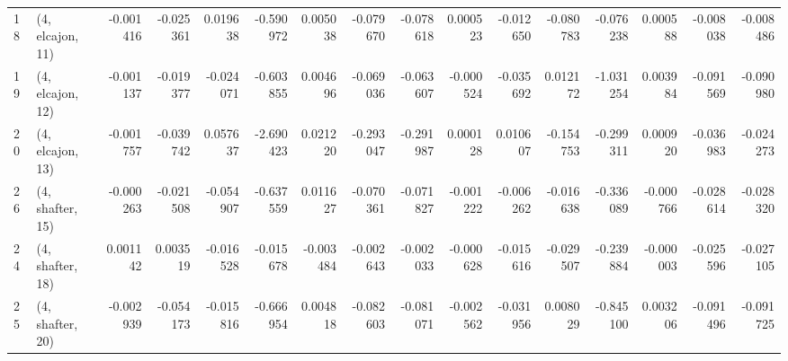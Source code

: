 \begin{tabular}{llrrrrrrrrrrrrrr}
18 &  (4, elcajon, 11) &  -0.001416 & -0.025361 &  0.019638 &  -0.590972 &  0.005038 &  -0.079670 & -0.078618 &  0.000523 & -0.012650 & -0.080783 &  -0.076238 &  0.000588 & -0.008038 & -0.008486 \\
19 &  (4, elcajon, 12) &  -0.001137 & -0.019377 & -0.024071 &  -0.603855 &  0.004696 &  -0.069036 & -0.063607 & -0.000524 & -0.035692 &  0.012172 &  -1.031254 &  0.003984 & -0.091569 & -0.090980 \\
20 &  (4, elcajon, 13) &  -0.001757 & -0.039742 &  0.057637 &  -2.690423 &  0.021220 &  -0.293047 & -0.291987 &  0.000128 &  0.010607 & -0.154753 &  -0.299311 &  0.000920 & -0.036983 & -0.024273 \\
26 &  (4, shafter, 15) &  -0.000263 & -0.021508 & -0.054907 &  -0.637559 &  0.011627 &  -0.070361 & -0.071827 & -0.001222 & -0.006262 & -0.016638 &  -0.336089 & -0.000766 & -0.028614 & -0.028320 \\
24 &  (4, shafter, 18) &   0.001142 &  0.003519 & -0.016528 &  -0.015678 & -0.003484 &  -0.002643 & -0.002033 & -0.000628 & -0.015616 & -0.029507 &  -0.239884 & -0.000003 & -0.025596 & -0.027105 \\
25 &  (4, shafter, 20) &  -0.002939 & -0.054173 & -0.015816 &  -0.666954 &  0.004818 &  -0.082603 & -0.081071 & -0.002562 & -0.031956 &  0.008029 &  -0.845100 &  0.003206 & -0.091496 & -0.091725 \\
\bottomrule
\end{tabular}

